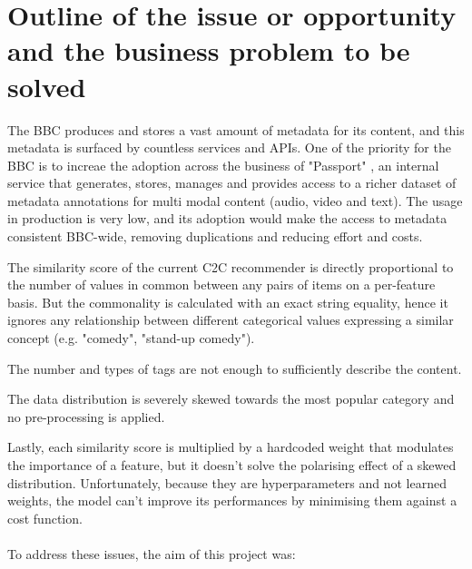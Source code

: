 
\section{Outline of the issue or opportunity and the business problem to be solved}

The BBC produces and stores a vast amount of metadata for its content, and this metadata is surfaced by countless services and APIs.
One of the priority for the BBC is to increae the adoption across the business of "Passport" \cite{BbcPassportMetadata}, an internal service that generates,
stores, manages and provides access to a richer dataset of metadata annotations for multi modal content (audio, video and text).
The usage in production is very low, and its adoption would make the access to metadata consistent BBC-wide,
removing duplications and reducing effort and costs.

The similarity score of the current C2C recommender is directly proportional to the number of values in common between any pairs of items
on a per-feature basis. But the commonality is calculated with an exact string equality, hence it ignores any relationship between different
categorical values expressing a similar concept (e.g. "comedy", "stand-up comedy").

The number and types of tags are not enough to sufficiently
describe the content.

The data distribution is severely skewed towards the most popular category and no pre-processing
is applied.

Lastly, each similarity score is multiplied by a hardcoded weight that modulates the importance of a feature, but it doesn't solve
the polarising effect of a skewed distribution. Unfortunately, because they are hyperparameters and not learned weights, the model can't improve
its performances by minimising them against a cost function.
\\ \\
To address these issues, the aim of this project was:

